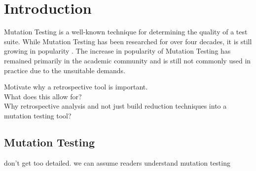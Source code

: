 \section{Introduction}
Mutation Testing is a well-known technique for determining the quality
of a test suite. While Mutation Testing has been researched for over four
decades, it is still growing in popularity \cite{jia2011analysis}.
The increase in popularity of Mutation Testing has remained primarily
in the academic community and is still not commonly used in practice due
to the unsuitable demands.

Motivate why a retrospective tool is important. \\
What does this allow for?\\
Why retrospective analysis and not just build reduction techniques into a mutation testing tool?\\

\subsection{Mutation Testing}
don't get too detailed. we can assume readers understand mutation testing

